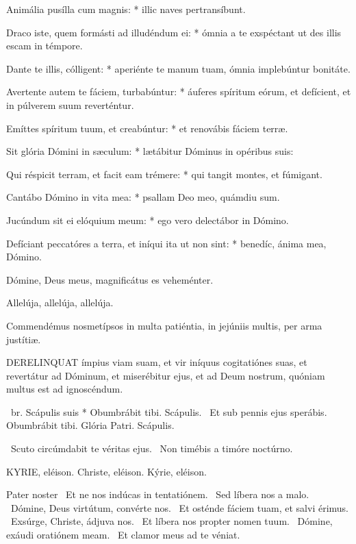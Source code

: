 Animália pusílla cum magnis: * illic naves pertransíbunt.

Draco iste, quem formásti ad illudéndum ei: * ómnia a te exspéctant ut des illis escam in témpore.

Dante te illis, cólligent: * aperiénte te manum tuam, ómnia implebúntur bonitáte.

Avertente autem te fáciem, turbabúntur: * áuferes spíritum eórum, et defícient, et in púlverem suum reverténtur.

Emíttes spíritum tuum, et creabúntur: * et renovábis fáciem terræ.

Sit glória Dómini in sæculum: * lætábitur Dóminus in opéribus suis:

Qui réspicit terram, et facit eam trémere: * qui tangit montes, et fúmigant.

Cantábo Dómino in vita mea: * psallam Deo meo, quámdiu sum.

Jucúndum sit ei elóquium meum: * ego vero delectábor in Dómino.

Defíciant peccatóres a terra, et iníqui ita ut non sint: * benedíc, ánima mea, Dómino.

  Dómine, Deus meus, magnificátus es veheménter.

  Allelúja, allelúja, allelúja.



 Commendémus nosmetípsos in multa patiéntia, in jejúniis multis, per arma justítiæ.


\lettrine[lines=2]{D}{ERELINQUAT} ímpius viam suam, et vir iníquus cogitatiónes suas, et revertátur ad Dóminum, et miserébitur ejus, et ad Deum nostrum, quóniam multus est ad ignoscéndum.

\R\ br. Scápulis suis * Obumbrábit tibi. Scápulis. \V\ Et sub pennis ejus sperábis. Obumbrábit tibi. Glória Patri. Scápulis.

\V\ Scuto circúmdabit te véritas ejus. \R\ Non timébis a timóre noctúrno.


KYRIE, eléison. Christe, eléison. Kýrie, eléison.

Pater noster  \V\ Et ne nos indúcas in tentatiónem. \R\ Sed líbera nos a malo. \V\ Dómine, Deus virtútum, convérte nos. \R\ Et osténde fáciem tuam, et salvi érimus. \V\ Exsúrge, Christe, ádjuva nos. \R\ Et líbera nos propter nomen tuum. \V\ Dómine, exáudi oratiónem meam. \R\ Et clamor meus ad te véniat.

